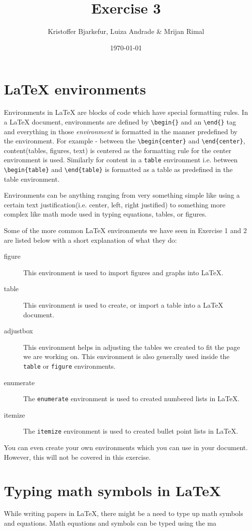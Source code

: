 \documentclass{article}            %
\title{Exercise 3} 	%
\author{Kristoffer Bjarkefur, Luiza Andrade \& Mrijan Rimal}
\date{\today}                    							%
\begin{document}
           

\maketitle
\newpage

\section*{{\LaTeX} environments}
Environments in {\LaTeX} are blocks of code which have special formatting rules. In a {\LaTeX} document, environments are defined by \verb|\begin{}| and an \verb|\end{}| tag and everything in those \textit{environment} is formatted in the manner predefined by the environment. For example - between the \verb|\begin{center}| and \verb|\end{center}|, content(tables, figures, text) is centered as the formatting rule for the center environment is used. Similarly for content in a \texttt{table} environment i.e. between \verb|\begin{table}| and \verb|\end{table}| is formatted as a table as predefined in the table environment. 

Environments can be anything ranging from very something simple like using a certain text justification(i.e. center, left, right justified) to something more complex like math mode used in typing equations, tables, or figures. 

Some of the more common {\LaTeX} environments we have seen in Exercise 1 and 2 are listed below with a short explanation of what they do: 

\begin{description}
	\item[figure] This environment is used to import figures and graphs into {\LaTeX}. 
	\item[table] This environment is used to create, or import a table into a {\LaTeX} document.
	\item[adjustbox] This environment helps in adjusting the tables we created to fit the page we are working on. This environment is also generally used inside the \texttt{table} or \texttt{figure} environments.
	\item[enumerate] The \texttt{enumerate} environment is used to created numbered lists in {\LaTeX}. 
	\item[itemize] The \texttt{itemize} environment is used to created bullet point lists in {\LaTeX}.
\end{description} 

You can even create your own environments which you can use in your document. However, this will not be covered in this exercise. 

\section*{Typing math symbols in {\LaTeX}}
While writing papers in {\LaTeX}, there might be a need to type up math symbols and equations. Math equations and symbols can be typed using the ma
\end{document}
